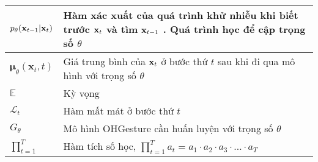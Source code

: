 \begin{center}
\begin{tabular}{|p{3cm}|p{11cm}|}
\hline
$p_{\theta} (\mathbf{x}_{t-1} | \mathbf{x}_{t})$ & Hàm xác xuất của quá trình khử nhiễu khi biết trước $\mathbf{x}_{t}$ và tìm $\mathbf{x}_{t-1}$ . Quá trình học để cập trọng số $\theta$   \\
\hline
$\boldsymbol{\mu}_\theta(\mathbf{x}_t, t)$ & Giá trung bình của $\mathbf{x}_t$ ở bước thứ $t$ sau khi đi qua mô hình với trọng số $\theta$  \\
\hline
$\mathbb{E}$ & Kỳ vọng \\
\hline
$\mathcal{L}_t$ & Hàm mất mát ở bước thứ $t$ \\
\hline
$G_\theta$ & Mô hình OHGesture cần huấn luyện với trọng số $\theta$ \\
\hline
$\prod^T_{t=1}$ & Hàm tích số học, $\prod_{t=1}^T a_t = a_1 \cdot a_2 \cdot a_3 \cdot \ldots \cdot a_T$  \\
\hline


\end{tabular}
\end{center}


\pagebreak
